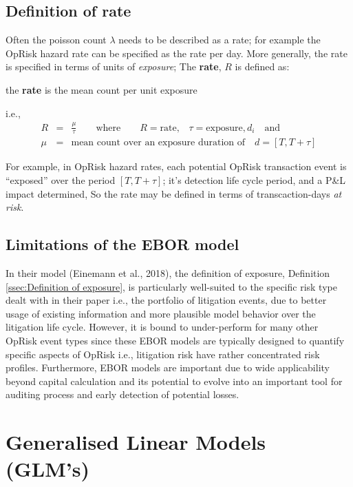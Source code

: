 \documentclass{DissertateUSU}
\begin{document}
\subsection{Definition of rate}
\label{ssec:Definition of rate}

Often the poisson count \(\lambda\) needs to be described as a rate; for
example the OpRisk hazard rate can be specified as the rate per day.
More generally, the rate is specified in terms of units of
\emph{exposure}; The \textbf{rate}, \(R\) is defined as:\medskip

\begin{definition}
the \textbf{rate} is the mean count per unit exposure
\end{definition}

i.e., \singlespacing \begin{eqnarray}
R &=& \frac{\mu}{\tau} \qquad \mbox{where} \qquad R = \mbox{rate,} \quad \tau = \mbox{exposure},d_{i}\quad \mbox{and}\nonumber\\
\mu &=& \mbox{mean count over an exposure duration of} \quad d = [T,T+\tau] \nonumber
\end{eqnarray} \doublespacing

For example, in OpRisk hazard rates, each potential OpRisk transaction
event is ``exposed'' over the period \([T,T+\tau]\); it's detection life
cycle period, and a P\&L impact determined, So the rate may be defined
in terms of transcaction-days \emph{at risk}.

\subsection{Limitations of the EBOR model}

In their model (Einemann et al., 2018), the definition of exposure,
Definition \ref{ssec:Definition of exposure}, is particularly
well-suited to the specific risk type dealt with in their paper i.e.,
the portfolio of litigation events, due to better usage of existing
information and more plausible model behavior over the litigation life
cycle. However, it is bound to under-perform for many other OpRisk event
types since these EBOR models are typically designed to quantify
specific aspects of OpRisk i.e., litigation risk have rather
concentrated risk profiles. Furthermore, EBOR models are important due
to wide applicability beyond capital calculation and its potential to
evolve into an important tool for auditing process and early detection
of potential losses.

\section{Generalised Linear Models (GLM's)}
\label{sec:Generalised Linear Models}
\end{document}
